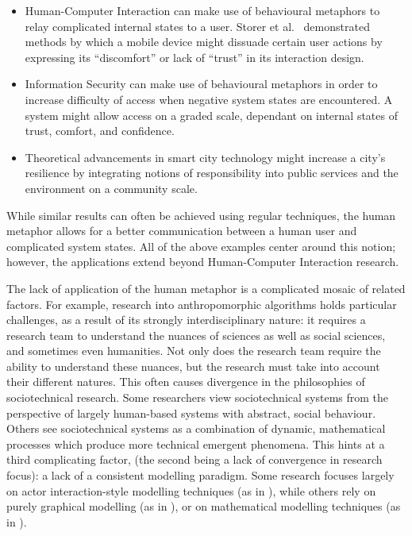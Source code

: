 \begin{itemize}
  \item Human-Computer Interaction can make use of behavioural metaphors to relay complicated internal states to a user. Storer et al.~\cite{storer_mobile_behaviour_poster} demonstrated methods by which a mobile device might dissuade certain user actions by expressing its ``discomfort'' or lack of ``trust'' in its interaction design.
  \item Information Security can make use of behavioural metaphors in order to increase difficulty of access when negative system states are encountered. A system might allow access on a graded scale, dependant on internal states of trust, comfort, and confidence.
  \item Theoretical advancements in smart city technology\cite{wallis_talk_about_x_talk} might increase a city's resilience by integrating notions of responsibility into public services and the environment on a community scale.\par
\end{itemize}

While similar results can often be achieved using regular techniques, the human metaphor allows for a better communication between a human user and complicated system states. All of the above examples center around this notion; however, the applications extend beyond Human-Computer Interaction research.\par

The lack of application of the human metaphor is a complicated mosaic of related factors. For example, research into anthropomorphic algorithms holds particular challenges, as a result of its strongly interdisciplinary nature: it requires a research team to understand the nuances of sciences as well as social sciences, and sometimes even humanities. Not only does the research team require the ability to understand these nuances, but the research must take into account their different natures. This often causes divergence in the philosophies of sociotechnical research. Some researchers view sociotechnical systems from the perspective of largely human-based systems with abstract, social behaviour. Others see sociotechnical systems as a combination of dynamic, mathematical processes which produce more technical emergent phenomena. This hints at a third complicating factor, (the second being a lack of convergence in research focus): a lack of a consistent modelling paradigm. Some research focuses largely on actor interaction-style modelling techniques (as in \cite{baxter2011socio}), while others rely on purely graphical modelling (as in \cite{ObashiMethodology}), or on mathematical modelling techniques (as in \cite{vespignani2012modelling}). \par

